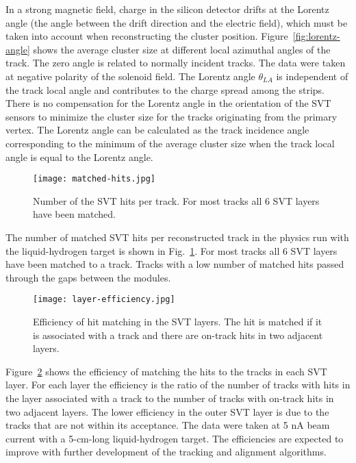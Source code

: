 In a strong magnetic field, charge in the silicon detector drifts at the Lorentz angle (the angle between the drift
direction and the electric field), which must be taken into account when reconstructing the cluster position.
Figure~\ref{fig:lorentz-angle} shows the average cluster size at different local azimuthal angles of the track. The
zero angle is related to normally incident tracks. The data were taken at negative polarity of the solenoid field. The
Lorentz angle $\theta_{LA}$ is independent of the track local angle and contributes to the charge spread among
the strips. There is no compensation for the Lorentz angle in the orientation of the SVT sensors to minimize the
cluster size for the tracks originating from the primary vertex. The Lorentz angle can be calculated as the track
incidence angle corresponding to the minimum of the average cluster size when the track local angle is equal to the
Lorentz angle.

\begin{figure}[hbt] 
\centering 
\texttt{[image: matched-hits.jpg]}
\caption{Number of the SVT hits per track. For most tracks all 6 SVT layers have been matched.}
\label{fig:matched-hits}
\end{figure}

The number of matched SVT hits per reconstructed track in the physics run with the liquid-hydrogen target is
shown in Fig.~\ref{fig:matched-hits}. For most tracks all 6 SVT layers have been matched to a track. Tracks
with a low number of matched hits passed through the gaps between the modules.


\begin{figure}[hbt] 
\centering 
\texttt{[image: layer-efficiency.jpg]}
\caption{Efficiency of hit matching in the SVT layers. The hit is matched if it is associated with a track and there
  are on-track hits in two adjacent layers.}
\label{fig:layer-efficiency}
\end{figure}

Figure~\ref{fig:layer-efficiency} shows the efficiency of matching the hits to the tracks in each SVT layer. For
each layer the efficiency is the ratio of the number of tracks with hits in the layer associated with a track to the
number of tracks with on-track hits in two adjacent layers. The lower efficiency in the outer SVT layer is due to
the tracks that are not within its acceptance. The data were taken at 5 nA beam current with a 5-cm-long
liquid-hydrogen target. The efficiencies are expected to improve with further development of the tracking and
alignment algorithms. 
